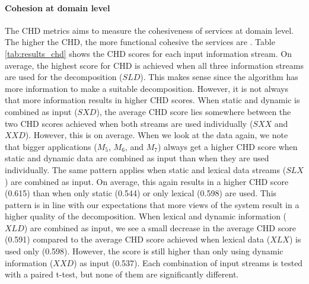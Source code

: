 \paragraph{Cohesion at domain level} The CHD metrics aims to measure the cohesiveness of services at domain level. The higher the CHD, the more functional cohesive the services are \cite{jin2018functionality}. Table \ref{tab:results_chd} shows the CHD scores for each input information stream. On average, the highest score for CHD is achieved when all three information streams are used for the decomposition ($SLD$). This makes sense since the algorithm has more information to make a suitable decomposition. However, it is not always that more information results in higher CHD scores. When static and dynamic is combined as input ($SXD$), the average CHD score lies somewhere between the two CHD scores achieved when both streams are used individually ($SXX$ and $XXD$). However, this is on average. When we look at the data again, we note that bigger applications ($M_5$, $M_6$, and $M_7$) always get a higher CHD score when static and dynamic data are combined as input than when they are used individually. The same pattern applies when static and lexical data streams ($SLX$) are combined as input. On average, this again results in a higher CHD score (0.615) than when only static (0.544) or only lexical (0.598) are used. This pattern is in line with our expectations that more views of the system result in a higher quality of the decomposition. When lexical and dynamic information ($XLD$) are combined as input, we see a small decrease in the average CHD score (0.591) compared to the average CHD score achieved when lexical data ($XLX$) is used only (0.598). However, the score is still higher than only using dynamic information ($XXD$) as input (0.537). Each combination of input streams is tested with a paired t-test, but none of them are significantly different. 



